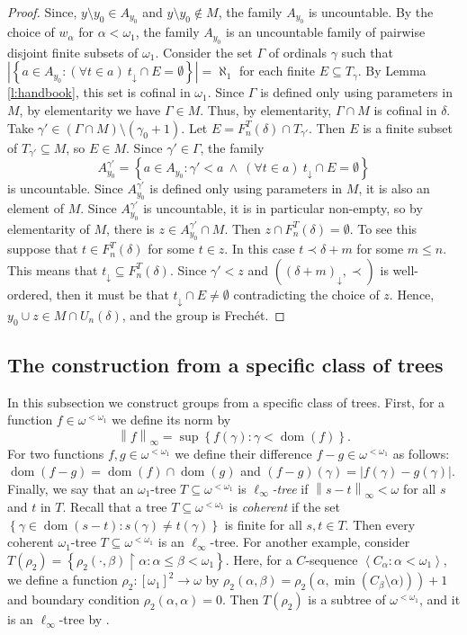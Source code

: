 \documentclass{amsart}
\theoremstyle{plain}
\theoremstyle{definition}
\numberwithin{equation}{section}
\renewcommand{\a}{\alpha}
\renewcommand{\b}{\beta}
\newcommand{\g}{\gamma}
\renewcommand{\d}{\delta}
\renewcommand{\o}{\omega}
\newcommand{\ps}{\emptyset}
\newcommand{\rest}{\upharpoonright}
\newcommand{\sst}{\subseteq}
\newcommand{\seq}[1]{\left<#1\right>}
\newcommand{\set}[1]{\left\{#1\right\}}
\newcommand{\abs}[1]{\left\vert#1\right\vert}
\newcommand{\norm}[1]{\left\lVert#1\right\rVert_{\infty}}
\newcommand{\dom}{\operatorname{dom}}
\begin{document}
\begin{proof}
	Since, $y\setminus y_0\in A_{y_0}$ and $y\setminus y_0\notin M$, the family $A_{y_0}$ is uncountable.
	By the choice of $w_{\a}$ for $\a<\o_1$, the family $A_{y_0}$ is an uncountable family of pairwise disjoint finite subsets of $\o_1$.
	Consider the set $\Gamma$ of ordinals $\g$ such that $\abs{\set{a\in A_{y_0}: (\forall t\in a)\ t_{\downarrow}\cap E=\ps}}=\aleph_1$ for each finite $E\sst T_{\g}$.
	By Lemma \ref{l:handbook}, this set is cofinal in $\o_1$.
	Since $\Gamma$ is defined only using parameters in $M$, by elementarity we have $\Gamma\in M$.
	Thus, by elementarity, $\Gamma\cap M$ is cofinal in $\d$.
	Take $\g'\in (\Gamma\cap M)\setminus (\g_0+1)$.
	Let $E=F^T_n(\d)\cap T_{\g'}$.
	Then $E$ is a finite subset of $T_{\g'}\sst M$, so $E\in M$.
	Since $\g'\in\Gamma$, the family $$A^{\g'}_{y_0}=\set{a\in A_{y_0}: \g'<a\ \wedge\ (\forall t\in a)\ t_{\downarrow}\cap E=\ps}$$ is uncountable.
	Since $A^{\g'}_{y_0}$ is defined only using parameters in $M$, it is also an element of $M$.
	Since $A^{\g'}_{y_0}$ is uncountable, it is in particular non-empty, so by elementarity of $M$, there is $z\in A^{\g'}_{y_0}\cap M$. 
	Then $z\cap F^T_n(\d)=\ps$.
	To see this suppose that $t\in F^T_n(\d)$ for some $t\in z$.
	In this case $t\prec \d+m$ for some $m\le n$.
	This means that $t_{\downarrow}\sst F^T_n(\d)$.
	Since $\g'<z$ and $((\d+m)_{\downarrow},\prec)$ is well-ordered, then it must be that $t_{\downarrow}\cap E\neq\ps$ contradicting the choice of $z$.
	Hence, $y_0\cup z\in M\cap U_n(\d)$, and the group is Frech\'et.
\end{proof}

\subsection{The construction from a specific class of trees}

In this subsection we construct groups from a specific class of trees.
First, for a function $f\in\o^{<\o_1}$ we define its norm by $$\norm{f}=\sup\set{f(\g):\g<\dom(f)}.$$
For two functions $f,g\in\o^{<\o_1}$ we define their difference $f-g\in\o^{<\o_1}$ as follows: $\dom(f-g)=\dom(f)\cap \dom(g)$ and $(f-g)(\g)=\abs{f(\g)-g(\g)}$.
Finally, we say that an $\o_1$-tree $T\sst \o^{<\o_1}$ is \emph{$\ell_{\infty}$-tree} if $\norm{s-t}<\o$ for all $s$ and $t$ in $T$.
Recall that a tree $T\sst \o^{<\o_1}$ is \emph{coherent} if the set $\set{\g\in\dom(s-t):s(\g)\neq t(\g)}$ is finite for all $s,t\in T$.
Then every coherent $\o_1$-tree $T\sst \o^{<\o_1}$ is an $\ell_{\infty}$-tree.
For another example, consider $T(\rho_2)=\set{\rho_2(\cdot,\b)\rest\a:\a\le\b<\o_1}$.
Here, for a $C$-sequence $\seq{C_{\a}:\a<\o_1}$, we define a function $\rho_2:[\o_1]^2\to\o$ by $\rho_2(\a,\b)=\rho_2\left(\a,\min\left(C_{\b}\setminus\a)\right)\right)+1$ and boundary condition $\rho_2(\a,\a)=0$.
Then $T(\rho_2)$ is a subtree of $\o^{<\o_1}$, and it is an $\ell_{\infty}$-tree by \cite[Lemma 2.4.2]{walks}.
\end{document}
